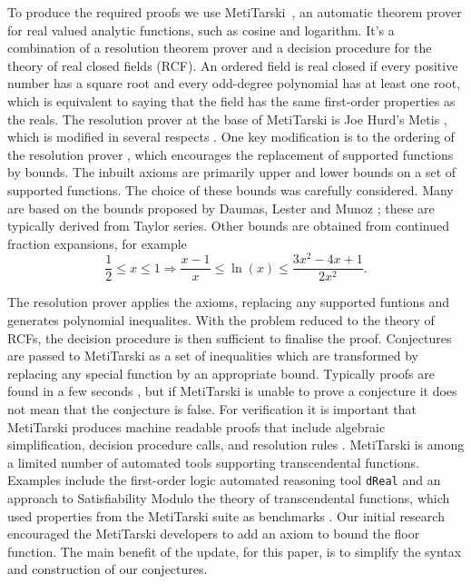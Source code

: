 \documentclass{fac}
\begin{document}
To produce the required proofs we use MetiTarski~\cite{akbarpour2010metitarski}, an automatic theorem prover for real valued analytic functions, such as cosine and logarithm. It's a combination of a resolution theorem prover and a decision procedure for the theory of real closed fields (RCF). An ordered field is real closed if every positive number has a square root and every odd-degree polynomial has at least one root, which is equivalent to saying that the field has the same first-order properties as the reals. The resolution prover at the base of MetiTarski is Joe Hurd's Metis \cite{metis_theorem_prover}, which is modified in several respects \cite{akbarpour2008metitarski}. One key modification is to the ordering of the resolution prover \cite{ludwig2007extension}, which encourages the replacement of supported functions by bounds. The inbuilt axioms are primarily upper and lower bounds on a set of supported functions. The choice of these bounds was carefully considered. Many are based on the bounds proposed by Daumas, Lester and Munoz \cite{daumas2008verified}; these are typically derived from Taylor series. Other bounds are obtained from continued fraction expansions, for example
\[\frac{1}{2} \leq x \leq 1 \Rightarrow \frac{x-1}{x} \leq \ln(x) \leq \frac{3x^2-4x+1}{2x^2}.\]

The resolution prover applies the axioms, replacing any supported funtions and generates polynomial inequalites. With the problem reduced to the theory of RCFs, the decision procedure is then sufficient to finalise the proof. Conjectures are passed to MetiTarski as a set of inequalities which are transformed by replacing any special function by an appropriate bound. Typically proofs are found in a few seconds \cite{akbarpour2009applications}, but if MetiTarski is unable to prove a conjecture it does not mean that the conjecture is false. For verification it is important that MetiTarski produces machine readable proofs that include algebraic simplification, decision procedure calls, and resolution rules \cite{denman2009formal}. MetiTarski is among a limited number of automated tools supporting transcendental functions. Examples include the first-order logic automated reasoning tool \texttt{dReal} \cite{gao2013dreal} and an approach to Satisfiability Modulo the theory of transcendental functions, which used properties from the MetiTarski suite as benchmarks \cite{cimatti2017satisfiability}. Our initial research encouraged the MetiTarski developers to add an axiom to bound the floor function. The main benefit of the update, for this paper, is to simplify the syntax and construction of our conjectures.  
\end{document}
